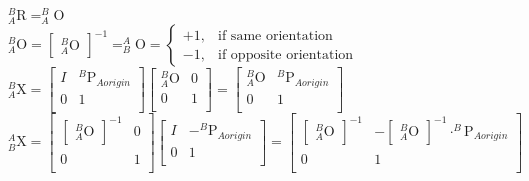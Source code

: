\documentclass[document]{standalone}
\begin{document}
\begin{preview}
\Large

${\displaystyle _{A}^{B}\textrm{R} = _{A}^{B}\textrm{O}}$\\
${\displaystyle _{A}^{B}\textrm{O}=\begin{bmatrix}_{A}^{B}\textrm{O}\end{bmatrix}_{}^{-1} = _{B}^{A}\textrm{O}}=\begin{cases} +1, & \text{if same orientation}\  \\
-1, & \text{if opposite orientation}
\end{cases}$
\\

${\displaystyle _{A}^{B}\textrm{X} =\begin{bmatrix}
I & _{}^{B}\textrm{P}_{A origin}^{} \\
0 & 1 \\
\end{bmatrix}\begin{bmatrix}
_{A}^{B}\textrm{O} & 0 \\
0 & 1 \\
\end{bmatrix}=\begin{bmatrix}
_{A}^{B}\textrm{O} & _{}^{B}\textrm{P}_{A origin}^{} \\
0 & 1 \\
\end{bmatrix}}$ \\

${\displaystyle _{B}^{A}\textrm{X}=\begin{bmatrix}
\begin{bmatrix}
_{A}^{B}\textrm{O}\end{bmatrix}_{}^{-1} &  0\\
0 & 1 \\
\end{bmatrix}\begin{bmatrix}
I & -_{}^{B}\textrm{P}_{A origin}^{} \\
0 & 1 \\
\end{bmatrix}=\begin{bmatrix}
\begin{bmatrix}
_{A}^{B}\textrm{O}\end{bmatrix}_{}^{-1} & -\begin{bmatrix}
_{A}^{B}\textrm{O}\end{bmatrix}_{}^{-1} \cdot _{}^{B}\textrm{P}_{A origin}^{}\\
0 & 1 \\
\end{bmatrix}}$

\end{preview}
\end{document}

